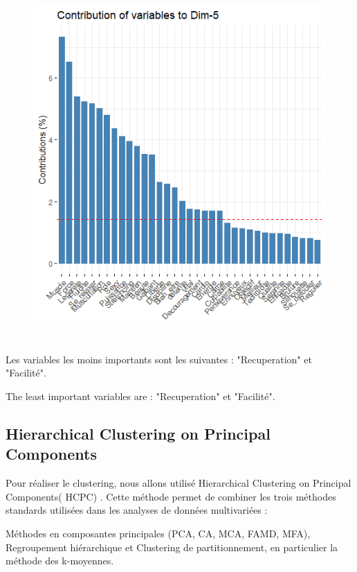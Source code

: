 \documentclass[12pt]{article}
\begin{document}
\begin{figure}[H]
\begin{center}
\includegraphics[scale=1.3]{ACP_6.png} 
\caption[]{\ }
\end{center}
\end{figure}


Les variables les moins importants  sont les suivantes : "Recuperation" et  "Facilité".

The least important variables are :
"Recuperation" et  "Facilité".

\newpage   


\subsection{Hierarchical Clustering on Principal Components} 


Pour réaliser le clustering, nous allons utilisé  Hierarchical Clustering on Principal Components( HCPC) .
Cette méthode permet de combiner les trois méthodes standards utilisées dans les analyses de données multivariées :

Méthodes en composantes principales (PCA, CA, MCA, FAMD, MFA),
Regroupement hiérarchique et
Clustering de partitionnement, en particulier la méthode des k-moyennes.
\end{document}
